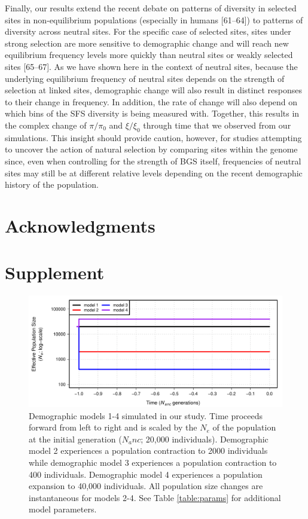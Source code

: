 \documentclass[9pt,twocolumn,twoside]{rilabRxiv}
\newcommand{\beginsupplement}{%
        \setcounter{table}{0}
        \renewcommand{\thetable}{S\arabic{table}}%
        \setcounter{figure}{0}
        \renewcommand{\thefigure}{S\arabic{figure}}%
     }
\begin{document}
Finally, our results extend the recent
debate on patterns of diversity in selected sites in non-equilibrium
populations (especially in humans [61--64]) to patterns of diversity
across neutral sites. For the specific case of selected sites, sites
under strong selection are more sensitive to demographic change and will
reach new equilibrium frequency levels more quickly than neutral sites
or weakly selected sites [65--67]. As we have shown here in the
context of neutral sites, because the underlying equilibrium frequency
of neutral sites depends on the strength of selection at linked sites,
demographic change will also result in distinct responses to their
change in frequency. In addition, the rate of change will also depend on
which bins of the SFS diversity is being measured with. Together, this
results in the complex change of $\pi/\pi_0$ and
$\xi/\xi_0$ through time that we observed from our simulations.
This insight should provide caution, however, for studies attempting to
uncover the action of natural selection by comparing sites within the
genome since, even when controlling for the strength of BGS itself,
frequencies of neutral sites may still be at different relative levels
depending on the recent demographic history of the population.

\section{Acknowledgments}




\onecolumn
\section*{Supplement}

\beginsupplement

\begin{figure}[h!]
\includegraphics[width=.9\linewidth]{figures/FigS1.pdf}
\caption{Demographic models 1-4 simulated in our study.
Time proceeds forward from left to right and is scaled by the $N_e$ of the population at the initial generation ($N_anc$; 20,000 individuals).
Demographic model 2 experiences a population contraction to 2000 individuals while demographic model 3 experiences a population contraction to 400 individuals.
Demographic model 4 experiences a population expansion to 40,000 individuals.
All population size changes are instantaneous for models 2-4.
See Table \ref{table:params} for additional model parameters.}
\label{fig:S1}
\end{figure}
\pagebreak
\end{document}
